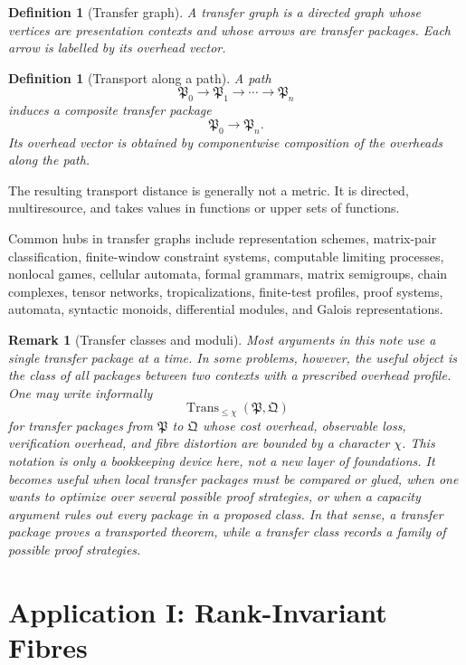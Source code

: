 \documentclass[11pt]{article}
\newtheorem{definition}[theorem]{Definition}
\newtheorem{remark}[theorem]{Remark}
\begin{document}
\begin{definition}[Transfer graph]
A transfer graph is a directed graph whose vertices are presentation contexts and whose arrows are transfer packages. Each arrow is labelled by its overhead vector.
\end{definition}

\begin{definition}[Transport along a path]
A path
\[
\mathfrak P_0\to\mathfrak P_1\to\cdots\to\mathfrak P_n
\]
induces a composite transfer package
\[
\mathfrak P_0\to\mathfrak P_n.
\]
Its overhead vector is obtained by componentwise composition of the overheads along the path.
\end{definition}

The resulting transport distance is generally not a metric. It is directed, multiresource, and takes values in functions or upper sets of functions.

Common hubs in transfer graphs include representation schemes, matrix-pair classification, finite-window constraint systems, computable limiting processes, nonlocal games, cellular automata, formal grammars, matrix semigroups, chain complexes, tensor networks, tropicalizations, finite-test profiles, proof systems, automata, syntactic monoids, differential modules, and Galois representations.

\begin{remark}[Transfer classes and moduli]
Most arguments in this note use a single transfer package at a time. In some problems, however, the useful object is the class of all packages between two contexts with a prescribed overhead profile. One may write informally
\[
\operatorname{Trans}_{\leq\chi}(\mathfrak P,\mathfrak Q)
\]
for transfer packages from \(\mathfrak P\) to \(\mathfrak Q\) whose cost overhead, observable loss, verification overhead, and fibre distortion are bounded by a character \(\chi\). This notation is only a bookkeeping device here, not a new layer of foundations. It becomes useful when local transfer packages must be compared or glued, when one wants to optimize over several possible proof strategies, or when a capacity argument rules out every package in a proposed class. In that sense, a transfer package proves a transported theorem, while a transfer class records a family of possible proof strategies.
\end{remark}

\section{Application I: Rank-Invariant Fibres}
\end{document}
